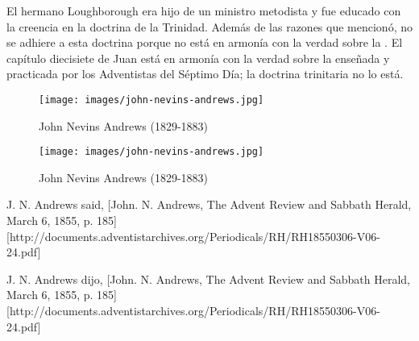 El hermano Loughborough era hijo de un ministro metodista y fue educado con la creencia en la doctrina de la Trinidad. Además de las razones que mencionó, no se adhiere a esta doctrina porque no está en armonía con la verdad sobre la . El capítulo diecisiete de Juan está en armonía con la verdad sobre la  enseñada y practicada por los Adventistas del Séptimo Día; la doctrina trinitaria no lo está.


\begin{figure}[hp]
    \centering
    \texttt{[image: images/john-nevins-andrews.jpg]}
    \caption*{John Nevins Andrews (1829-1883)}
    \label{fig:j-n-andrews}
\end{figure}


\begin{figure}[hp]
    \centering
    \texttt{[image: images/john-nevins-andrews.jpg]}
    \caption*{John Nevins Andrews (1829-1883)}
    \label{fig:j-n-andrews}
\end{figure}


J. N. Andrews said, [John. N. Andrews, The Advent Review and Sabbath Herald, March 6, 1855, p. 185][http://documents.adventistarchives.org/Periodicals/RH/RH18550306-V06-24.pdf]


J. N. Andrews dijo, [John. N. Andrews, The Advent Review and Sabbath Herald, March 6, 1855, p. 185][http://documents.adventistarchives.org/Periodicals/RH/RH18550306-V06-24.pdf]


